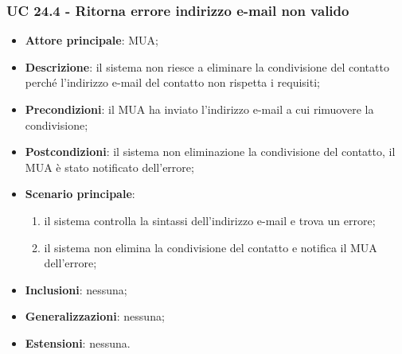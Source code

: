     \subsubsection{UC 24.4 - Ritorna errore indirizzo e-mail non valido} \label{sec:UC24.4}
    \begin{itemize}
        \item \textbf{Attore principale}: MUA;
        \item \textbf{Descrizione}: il sistema non riesce a eliminare la condivisione del contatto perché l'indirizzo e-mail del contatto non rispetta i requisiti;
        \item \textbf{Precondizioni}: il MUA ha inviato l'indirizzo e-mail a cui rimuovere la condivisione;
        \item \textbf{Postcondizioni}: il sistema non eliminazione la condivisione del contatto, il MUA è stato notificato dell'errore;
        \item \textbf{Scenario principale}:
            \begin{enumerate}
                \item il sistema controlla la sintassi dell'indirizzo e-mail e trova un errore;
                \item il sistema non elimina la condivisione del contatto e notifica il MUA dell'errore;
            \end{enumerate}
        \item \textbf{Inclusioni}: nessuna;
        \item \textbf{Generalizzazioni}: nessuna;
        \item \textbf{Estensioni}: nessuna.
    \end{itemize}
